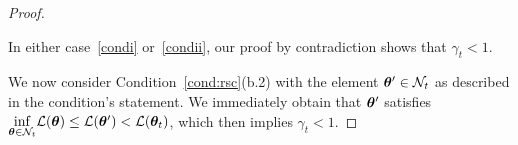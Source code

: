 \begin{proof}
\begin{enumerate}[(i)]
\end{enumerate}
In either case~\eqref{condi} or~\eqref{condii}, our proof by contradiction shows that 
$\gamma_t < 1$. 
%
%

We now consider Condition~\ref{cond:rsc}(b.2) with the 
element ${\bm{\theta}}'\in\mathcal{N}_t$ as described in the condition's statement.  %
We immediately obtain that ${\bm{\theta}}'$ satisfies $\underset{{\bm{\theta}} \in \mathcal{N}_t}{\inf}{\mathcal{L}}({\bm{\theta}}) \leq {\cal L}({\bm{\theta}}') < {\cal L}({\bm{\theta}}_t)$, which then implies $\gamma_t<1$.


\end{proof}
